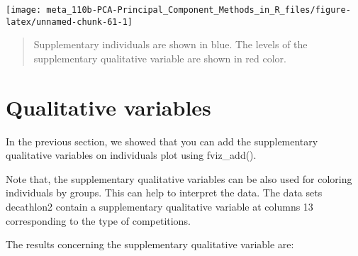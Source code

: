 \documentclass[]{book}
\newenvironment{Shaded}{\begin{snugshade}}{\end{snugshade}}
\newcommand{\CommentTok}[1]{\textcolor[rgb]{0.56,0.35,0.01}{\textit{#1}}}
\newcommand{\DataTypeTok}[1]{\textcolor[rgb]{0.13,0.29,0.53}{#1}}
\newcommand{\KeywordTok}[1]{\textcolor[rgb]{0.13,0.29,0.53}{\textbf{#1}}}
\newcommand{\NormalTok}[1]{#1}
\newcommand{\OperatorTok}[1]{\textcolor[rgb]{0.81,0.36,0.00}{\textbf{#1}}}
\newcommand{\OtherTok}[1]{\textcolor[rgb]{0.56,0.35,0.01}{#1}}
\newcommand{\StringTok}[1]{\textcolor[rgb]{0.31,0.60,0.02}{#1}}
\begin{document}
\begin{Shaded}
\end{Shaded}

\begin{center}\texttt{[image: meta\_110b-PCA-Principal\_Component\_Methods\_in\_R\_files/figure-latex/unnamed-chunk-61-1]} \end{center}

\begin{quote}
Supplementary individuals are shown in blue. The levels of the supplementary qualitative variable are shown in red color.
\end{quote}

\hypertarget{qualitative-variables}{%
\section{Qualitative variables}\label{qualitative-variables}}

In the previous section, we showed that you can add the supplementary qualitative variables on individuals plot using fviz\_add().

Note that, the supplementary qualitative variables can be also used for coloring individuals by groups. This can help to interpret the data. The data sets decathlon2 contain a supplementary qualitative variable at columns 13 corresponding to the type of competitions.

The results concerning the supplementary qualitative variable are:

\begin{Shaded}
\end{Shaded}
\end{document}
